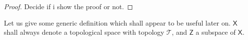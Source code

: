 \documentclass[10pt]{book}
\newcommand{\Tcal}{\mathcal{T}}
\newcommand{\Xcal}{\mathcal{X}}
\newcommand{\Xsf}{\mathsf{X}}
\newcommand{\Zsf}{\mathsf{Z}}
\theoremstyle{break}
\newtheorem{proof}{Proof}
\begin{document}
\begin{proof}
Decide if i show the proof or not.
%
%
%
%
\end{proof}


Let us give some generic definition which shall appear to be useful later on. $\Xsf$ shall always denote a topological space with topology $\Tcal$, and $\Zsf$ a subspace of $\Xsf$.%
\end{document}
